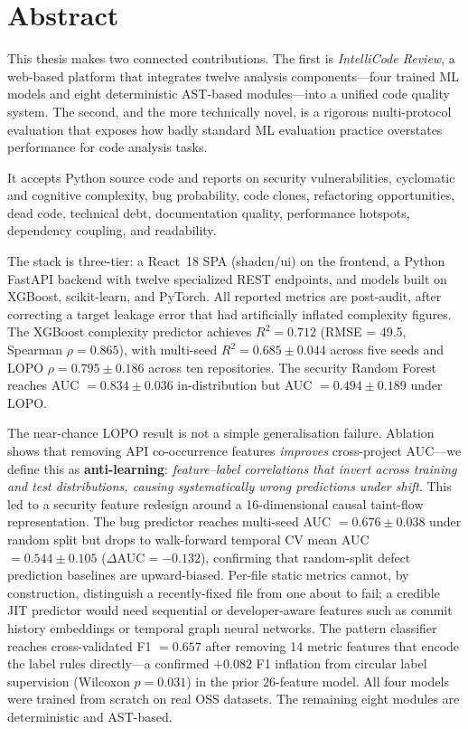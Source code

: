 \documentclass[12pt, oneside]{report}
\begin{document}
\setcounter{page}{1}

\chapter*{Abstract}

This thesis makes two connected contributions. The first is \textit{IntelliCode Review},
a web-based platform that integrates twelve analysis components---four trained ML models
and eight deterministic AST-based modules---into a unified code quality system. The second,
and the more technically novel, is a rigorous multi-protocol evaluation that exposes how
badly standard ML evaluation practice overstates performance for code analysis tasks.

It accepts Python source code and reports on security vulnerabilities, cyclomatic and
cognitive complexity, bug probability, code clones, refactoring opportunities, dead code,
technical debt, documentation quality, performance hotspots, dependency coupling, and
readability.

The stack is three-tier: a React~18 SPA (shadcn/ui) on the frontend, a Python FastAPI
backend with twelve specialized REST endpoints, and models built on XGBoost, scikit-learn,
and PyTorch. All reported metrics are post-audit, after correcting a target leakage error
that had artificially inflated complexity figures. The XGBoost complexity predictor achieves
$R^2 = 0.712$ (RMSE = 49.5, Spearman $\rho = 0.865$), with multi-seed
$R^2 = 0.685 \pm 0.044$ across five seeds and LOPO $\rho = 0.795 \pm 0.186$ across ten
repositories. The security Random Forest reaches AUC $= 0.834 \pm 0.036$ in-distribution
but AUC $= 0.494 \pm 0.189$ under LOPO.

The near-chance LOPO result is not a simple generalisation failure. Ablation shows that
removing API co-occurrence features \emph{improves} cross-project AUC---we define this
as \textbf{anti-learning}: \emph{feature--label correlations that invert across training
and test distributions, causing systematically wrong predictions under shift}. This led
to a security feature redesign around a 16-dimensional causal taint-flow representation.
The bug predictor reaches multi-seed AUC $= 0.676 \pm 0.038$ under random split but
drops to walk-forward temporal CV mean AUC $= 0.544 \pm 0.105$
($\Delta\text{AUC} = -0.132$), confirming that random-split defect prediction baselines
are upward-biased. Per-file static metrics cannot, by construction, distinguish a
recently-fixed file from one about to fail; a credible JIT predictor would need sequential
or developer-aware features such as commit history embeddings or temporal graph neural
networks. The pattern classifier reaches cross-validated F1 $= 0.657$ after removing 14
metric features that encode the label rules directly---a confirmed $+0.082$ F1 inflation
from circular label supervision (Wilcoxon $p = 0.031$) in the prior 26-feature model.
All four models were trained from scratch on real OSS datasets. The remaining eight modules
are deterministic and AST-based.
\end{document}
